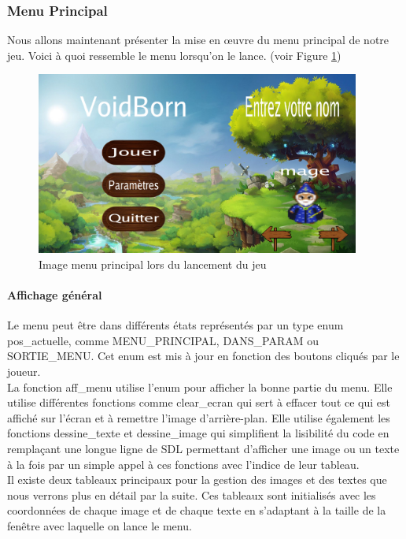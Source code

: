 \documentclass[11pt]{article}
\begin{document}
            \subsubsection{Menu Principal}
            Nous allons maintenant présenter la mise en œuvre du menu principal de notre jeu. 
            Voici à quoi ressemble le menu lorsqu’on le lance. (voir Figure \ref{fig:mainMenu})
            \begin{figure}[H]
                \begin{center}
                    \includegraphics[height=6cm]{screenMenu.png}
                    \caption{Image menu principal lors du lancement du jeu}
                    \label{fig:mainMenu} 
                \end{center}
            \end{figure}
                \paragraph{Affichage général}\leavevmode\newline
                Le menu peut être dans différents états représentés par un type enum pos\_actuelle, comme MENU\_PRINCIPAL, DANS\_PARAM ou SORTIE\_MENU. Cet enum est mis à jour en fonction des boutons cliqués par le joueur.\\  
                La fonction aff\_menu utilise l’enum pour afficher la bonne partie du menu. Elle utilise différentes fonctions comme clear\_ecran  qui sert à effacer tout ce qui est affiché sur l’écran et à remettre l’image d'arrière-plan. Elle utilise également les fonctions dessine\_texte et dessine\_image qui simplifient la lisibilité du code en remplaçant une longue ligne de SDL permettant d’afficher une image ou un texte à la fois par un simple appel à ces fonctions avec l’indice de leur tableau. \\
                Il existe deux tableaux principaux pour la gestion des images et des textes que nous verrons plus en détail par la suite. Ces tableaux sont initialisés avec les coordonnées de chaque image et de chaque texte en s’adaptant à la taille de la fenêtre avec laquelle on lance le menu.\\
\end{document}
